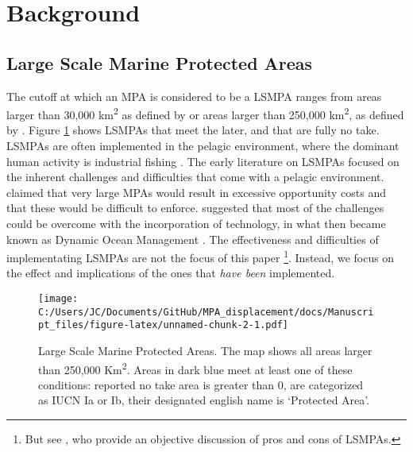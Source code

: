 \documentclass[11pt,]{article}
\let\rmarkdownfootnote\footnote%
\def\footnote{\protect\rmarkdownfootnote}
\begin{document}
\hypertarget{background}{%
\section{Background}\label{background}}

\hypertarget{large-scale-marine-protected-areas}{%
\subsection{Large Scale Marine Protected
Areas}\label{large-scale-marine-protected-areas}}

The cutoff at which an MPA is considered to be a LSMPA ranges from areas
larger than 30,000 km\textsuperscript{2} as defined by
\citet{desanto_2013} or areas larger than 250,000 km\textsuperscript{2},
as defined by \citep{toonen_2013}. Figure \ref{fig:LSMPAs_map} shows
LSMPAs that meet the later, and that are fully no take. LSMPAs are often
implemented in the pelagic environment, where the dominant human
activity is industrial fishing \citep{gray_2017,kroodsma_2018}. The
early literature on LSMPAs focused on the inherent challenges and
difficulties that come with a pelagic environment. \citet{kaplan_2010}
claimed that very large MPAs would result in excessive opportunity costs
and that these would be difficult to enforce. \citet{game_2009}
suggested that most of the challenges could be overcome with the
incorporation of technology, in what then became known as Dynamic Ocean
Management \citep{maxwell_2015}. The effectiveness and difficulties of
implementating LSMPAs are not the focus of this paper
\footnote{But see \citet{singleton_2014}, who provide an objective discussion of pros and cons of LSMPAs.}.
Instead, we focus on the effect and implications of the ones that
\emph{have been} implemented.

\begin{figure}
\centering
\texttt{[image: C:/Users/JC/Documents/GitHub/MPA\_displacement/docs/Manuscript\_files/figure-latex/unnamed-chunk-2-1.pdf]}
\caption{\label{fig:unnamed-chunk-2}\label{fig:LSMPAs_map}Large Scale Marine
Protected Areas. The map shows all areas larger than 250,000
Km\textsuperscript{2}. Areas in dark blue meet at least one of these
conditions: reported no take area is greater than 0, are categorized as
IUCN Ia or Ib, their designated english name is `Protected Area'.}
\end{figure}
\end{document}
